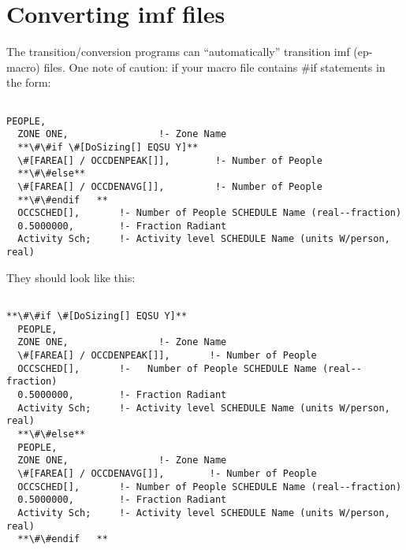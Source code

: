 \section{Converting imf files}\label{converting-imf-files}

The transition/conversion programs can ``automatically'' transition imf (ep-macro) files. One note of caution: if your macro file contains \#if statements in the form:

\begin{lstlisting}

PEOPLE,
  ZONE ONE,                !- Zone Name
  **\#\#if \#[DoSizing[] EQSU Y]**
  \#[FAREA[] / OCCDENPEAK[]],        !- Number of People
  **\#\#else**
  \#[FAREA[] / OCCDENAVG[]],         !- Number of People
  **\#\#endif   **
  OCCSCHED[],       !- Number of People SCHEDULE Name (real--fraction)
  0.5000000,        !- Fraction Radiant
  Activity Sch;     !- Activity level SCHEDULE Name (units W/person, real)
\end{lstlisting}

They should look like this:

\begin{lstlisting}

**\#\#if \#[DoSizing[] EQSU Y]**
  PEOPLE,
  ZONE ONE,                !- Zone Name
  \#[FAREA[] / OCCDENPEAK[]],       !- Number of People
  OCCSCHED[],       !-   Number of People SCHEDULE Name (real--fraction)
  0.5000000,        !- Fraction Radiant
  Activity Sch;     !- Activity level SCHEDULE Name (units W/person, real)
  **\#\#else**
  PEOPLE,
  ZONE ONE,                !- Zone Name
  \#[FAREA[] / OCCDENAVG[]],        !- Number of People
  OCCSCHED[],       !- Number of People SCHEDULE Name (real--fraction)
  0.5000000,        !- Fraction Radiant
  Activity Sch;     !- Activity level SCHEDULE Name (units W/person, real)
  **\#\#endif   **
\end{lstlisting}
